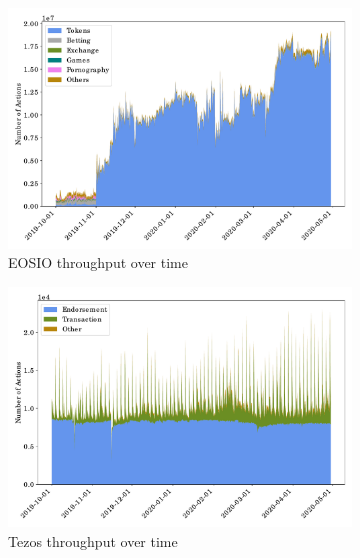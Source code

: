 \begin{figure}[tbp]
	\begin{subfigure}{\columnwidth}
		\centering
		\includegraphics[height=.27\textheight]{./4-transactions-security/figures/eos-chart-area.pdf}
		\caption{EOSIO throughput over time}
		\label{fig:eos-throughput-time}
	\end{subfigure}
	\begin{subfigure}{\columnwidth}
		\centering
		\includegraphics[height=.27\textheight]{./4-transactions-security/figures/tezos-chart-area.pdf}
		\caption{Tezos throughput over time}
		\label{fig:tezos-throughput-time}
	\end{subfigure}
	\begin{subfigure}{\columnwidth}
		\centering

\end{subfigure}
\end{figure}
